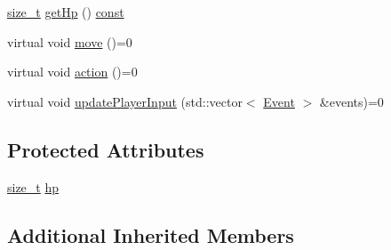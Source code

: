\begin{DoxyCompactItemize}
\item 
\hyperlink{nc__alloc_8h_a7b60c5629e55e8ec87a4547dd4abced4}{size\-\_\-t} \hyperlink{classarcade_1_1_a_living_entity_a27f635aeaf1d176bbca08669ef7451cd}{get\-Hp} () \hyperlink{term__entry_8h_a57bd63ce7f9a353488880e3de6692d5a}{const} 
\item 
virtual void \hyperlink{classarcade_1_1_a_living_entity_ac0e3ae518b9548f845479ad87f3adc89}{move} ()=0
\item 
virtual void \hyperlink{classarcade_1_1_a_living_entity_afce22ef387a77976ae3b0121dd74ac82}{action} ()=0
\item 
virtual void \hyperlink{classarcade_1_1_a_living_entity_a73b611bacb561279a6118131f2692674}{update\-Player\-Input} (std\-::vector$<$ \hyperlink{structarcade_1_1_event}{Event} $>$ \&events)=0
\end{DoxyCompactItemize}
\subsection*{Protected Attributes}
\begin{DoxyCompactItemize}
\item 
\hyperlink{nc__alloc_8h_a7b60c5629e55e8ec87a4547dd4abced4}{size\-\_\-t} \hyperlink{classarcade_1_1_a_living_entity_a47a3ed7e55199abbf84e2b80eb9df233}{hp}
\end{DoxyCompactItemize}
\subsection*{Additional Inherited Members}


